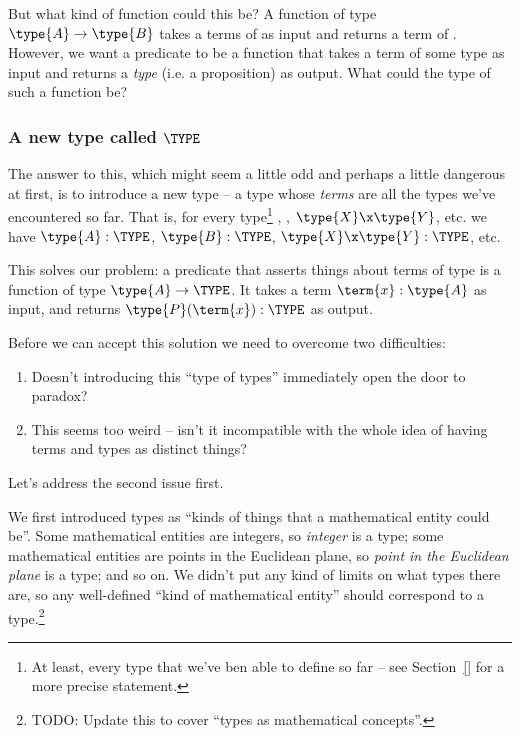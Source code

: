 But what kind of function could this be?  A function of type $\type{A} \to \type{B}$ takes a terms of  as input and returns a term of .  However, we want a predicate to be a function that takes a term of some type as input and returns a \emph{type} (i.e. a proposition) as output.  What could the type of such a function be?


\subsubsection{A new type called $\TYPE$}
\label{sec:Quantifiers-TypeCalledTYPE}

The answer to this, which might seem a little odd and perhaps a little dangerous at first, is to introduce a new type -- a type whose \emph{terms} are all the types we've encountered so far.
That is, for every type\footnote{
At least, every type that we've ben able to define so far -- see Section~\ref{} for a more precise statement.
}
, 
, 
$\type{X} \x \type{Y}$, etc. 
we have
$\type{A}:\TYPE$, 
$\type{B}:\TYPE$, 
$\type{X} \x \type{Y}:\TYPE$, etc. 

This solves our problem: 
a predicate  that asserts things about terms of type  is a function of type $\type{A} \to \TYPE$.  It takes a term $\term{x}:\type{A}$ as input, and returns $\type{P}(\term{x}):\TYPE$ as output.


Before we can accept this solution we need to overcome two difficulties: 
\begin{enumerate}
\item Doesn't introducing this ``type of types'' immediately open the door to paradox?  
\item This seems too weird -- isn't it incompatible with the whole idea of having terms and types as distinct things?
\end{enumerate}
Let's address the second issue first.

We first introduced types as ``kinds of things that a mathematical entity could be''.  
Some mathematical entities are integers, so \emph{integer} is a type; 
some mathematical entities are points in the Euclidean plane, so 
\emph{point in the Euclidean plane} is a type; and so on.  We didn't put any kind of limits on what types there are, so any well-defined ``kind of mathematical entity'' should correspond to a type.\footnote{
TODO: Update this to cover ``types as mathematical concepts''.
}

